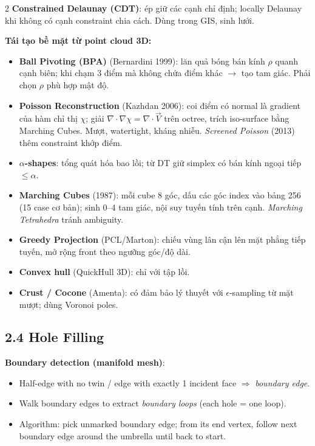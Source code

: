 \begin{paracol}{2}
\textbf{Constrained Delaunay (CDT)}: ép giữ các cạnh chỉ định; locally Delaunay khi không có cạnh constraint chia cách. Dùng trong GIS, sinh lưới.

\textbf{Tái tạo bề mặt từ point cloud 3D:}
\begin{itemize}[leftmargin=*,nosep]
  \item \textbf{Ball Pivoting (BPA)} (Bernardini 1999): lăn quả bóng bán kính $\rho$ quanh cạnh biên; khi chạm 3 điểm mà không chứa điểm khác $\to$ tạo tam giác. Phải chọn $\rho$ phù hợp mật độ.
  \item \textbf{Poisson Reconstruction} (Kazhdan 2006): coi điểm có normal là gradient của hàm chỉ thị $\chi$; giải $\nabla\!\cdot\!\nabla\chi = \nabla\!\cdot\!\vec V$ trên octree, trích iso-surface bằng Marching Cubes. Mượt, watertight, kháng nhiễu. \emph{Screened Poisson} (2013) thêm constraint khớp điểm.
  \item \textbf{$\alpha$-shapes}: tổng quát hóa bao lồi; từ DT giữ simplex có bán kính ngoại tiếp $\le\alpha$.
  \item \textbf{Marching Cubes} (1987): mỗi cube 8 góc, dấu các góc index vào bảng 256 (15 case cơ bản); sinh 0–4 tam giác, nội suy tuyến tính trên cạnh. \emph{Marching Tetrahedra} tránh ambiguity.
  \item \textbf{Greedy Projection} (PCL/Marton): chiếu vùng lân cận lên mặt phẳng tiếp tuyến, mở rộng front theo ngưỡng góc/độ dài.
  \item \textbf{Convex hull} (QuickHull 3D): chỉ với tập lồi.
  \item \textbf{Crust / Cocone} (Amenta): có đảm bảo lý thuyết với $\epsilon$-sampling từ mặt mượt; dùng Voronoi poles.
\end{itemize}

\switchcolumn*

\subsection*{2.4 Hole Filling}

\textbf{Boundary detection (manifold mesh)}:
\begin{itemize}[leftmargin=*,nosep]
  \item Half-edge with no twin / edge with exactly 1 incident face $\Rightarrow$ \emph{boundary edge}.
  \item Walk boundary edges to extract \emph{boundary loops} (each hole = one loop).
  \item Algorithm: pick unmarked boundary edge; from its end vertex, follow next boundary edge around the umbrella until back to start.
\end{itemize}


\end{paracol}
